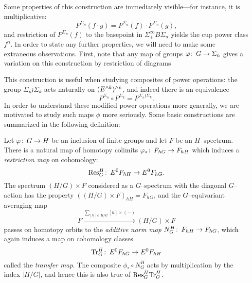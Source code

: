 Some properties of this construction are immediately visible---for instance, it is multiplicative: \[P^{\Sigma_n}(f \cdot g) = P^{\Sigma_n}(f) \cdot P^{\Sigma_n}(g),\] and restriction of $P^{\Sigma_n}(f)$ to the basepoint in $\Sigma^\infty_+ B\Sigma_n$ yields the cup power class $f^n$.  In order to state any further properties, we will need to make some extraneous observations.  First, note that any map of groups $\varphi\colon\thinspace G \to \Sigma_n$ gives a variation on this construction by restriction of diagrams
\begin{center}
\end{center}
This construction is useful when studying composites of power operations: the group $\Sigma_n \wr \Sigma_k$ acts naturally on $(E^{\wedge k})^{\wedge n}$, and indeed there is an equivalence \[P^{\Sigma_n} \circ P^{\Sigma_k} = P^{\Sigma_n \wr \Sigma_k}.\]  In order to understand these modified power operations more generally, we are motivated to study such maps $\phi$ more seriously.  Some basic constructions are summarized in the following definition:
\begin{definition}
Let $\varphi\colon\thinspace G \to H$ be an inclusion of finite groups and let $F$ be an $H$--spectrum.  There is a natural map of homotopy colimits $\varphi_*\colon\thinspace F_{hG} \to F_{hH}$ which induces a \textit{restriction map} on cohomology: \[\mathrm{Res}_G^H\colon\thinspace E^0 F_{hH} \to E^0 F_{hG}.\]  The spectrum $(H/G) \times F$ considered as a $G$--spectrum with the diagonal $G$--action has the property $((H/G) \times F)_{hH} = F_{hG}$, and the $G$--equivariant averaging map \[F \xrightarrow{\displaystyle \sum_{[h] \in H/G} [h] \times (-)} (H/G) \times F\] passes on homotopy orbits to the \textit{additive norm map} $N_G^H\colon\thinspace F_{hH} \to F_{hG}$, which again induces a map on cohomology classes \[\mathrm{Tr}_G^H\colon\thinspace E^0 F_{hG} \to E^0 F_{hH}\] called the \textit{transfer map}.  The composite $\phi_* \circ N_G^H$ acts by multiplication by the index $|H/G|$, and hence this is also true of $\mathrm{Res}^H_G \mathrm{Tr}^H_G$.
\end{definition}

